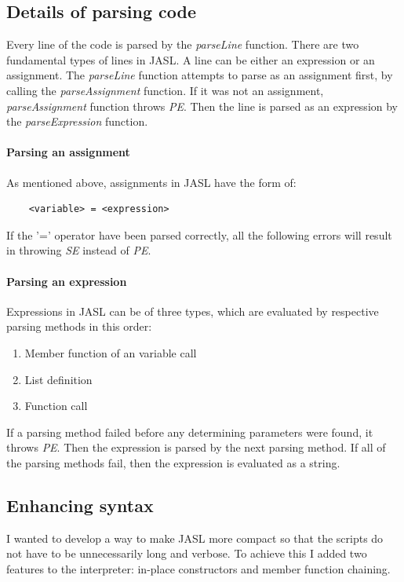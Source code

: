 \documentclass{ctuthesis}
\begin{document}
\subsection{Details of parsing code}
Every line of the code is parsed by the \textit{parseLine} function. There are two fundamental types of lines in JASL. A line can be either an expression or an assignment. The \textit{parseLine} function attempts to parse as an assignment first, by calling the \textit{parseAssignment} function. If it was not an assignment, \textit{parseAssignment} function throws \textit{PE}. Then the line is parsed as an expression by the \textit{parseExpression} function.

\paragraph{Parsing an assignment}
As mentioned above, assignments in JASL have the form of:
\begin{verbatim}
	<variable> = <expression>
\end{verbatim}

If the '=' operator have been parsed correctly, all the following errors will result in throwing \textit{SE} instead of \textit{PE}.  

\paragraph{Parsing an expression}
Expressions in JASL can be of three types, which are evaluated by respective parsing methods in this order:
\begin{enumerate}
	\item Member function of an variable call
	\item List definition
	\item Function call
\end{enumerate}

If a parsing method failed before any determining parameters were found, it throws \textit{PE}. Then the expression is parsed by the next parsing method. If all of the parsing methods fail, then the expression is evaluated as a string. 

\subsection{Enhancing syntax}

I wanted to develop a way to make JASL more compact so that the scripts do not have to be unnecessarily long and verbose. To achieve this I added two features to the interpreter: in-place constructors and member function chaining.
\end{document}
